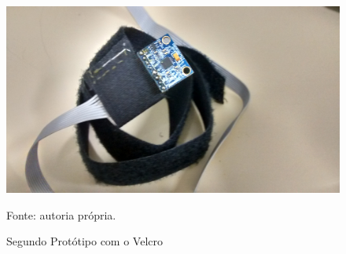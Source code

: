 	 	\begin{figure}[h]
	 		\centering
	 		\includegraphics[keepaspectratio=true,scale=0.15]{figuras/prototipo_2_1.jpg}
	 		\caption{Segundo Protótipo com o Velcro}
	 		Fonte: autoria própria. 
	 		\label{prototipo2}	
	 	\end{figure}
